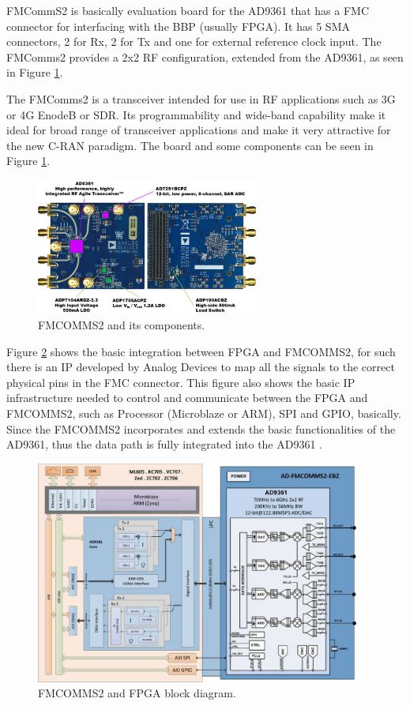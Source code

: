 FMCommS2 is basically evaluation board for the AD9361 that has a FMC connector
for interfacing with the BBP (usually FPGA). It has 5 SMA connectors, 2 for Rx,
2 for Tx and one for external reference clock input. The FMComms2 provides a 2x2
RF configuration, extended from the AD9361, as seen in Figure \ref{fig:fmcomm}.

The FMComms2 is a transceiver intended for use in RF applications such  as 3G or
4G EnodeB or SDR. Its programmability and wide-band capability make it ideal for
broad range of transceiver applications and make it very attractive for the new
C-RAN paradigm. The board and some components can be seen in Figure
\ref{fig:fmcomm}.

\begin{figure}[htbp]
    \centering
    \includegraphics[width=0.65\textwidth]{./figures/fmcomms2_pic}
    \caption{ FMCOMMS2 and its components.
    \label{fig:fmcomm}}
\end{figure}

Figure \ref{fig:fmcommbd} shows the basic integration between FPGA and FMCOMMS2,
for such there is an IP developed by Analog Devices to map all the signals to
the correct physical pins in the FMC connector. This figure also shows the
basic IP infrastructure needed to control and communicate between the FPGA and
FMCOMMS2, such as Processor (Microblaze or ARM), SPI and GPIO, basically. Since
the FMCOMMS2 incorporates and extends the basic functionalities of the AD9361,
thus the data path is fully integrated into the AD9361 \cite{web:fmcomms2wiki}.

\begin{figure}[htbp]
    \centering
    \includegraphics[width=0.95\textwidth]{./figures/fmcomms2_bd}
    \caption{ FMCOMMS2 and FPGA block diagram.
    \label{fig:fmcommbd}}
\end{figure}


